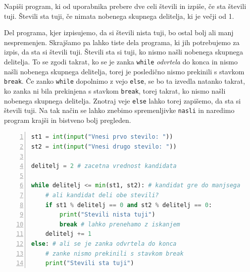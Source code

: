 \begin{zgled}
Napiši program, ki od uporabnika prebere dve celi števili in izpiše, če sta števili tuji. Števili sta tuji, če nimata nobenega skupnega delitelja, ki je večji od 1.
\end{zgled}
\begin{resitev}
Del programa, kjer izpisujemo, da si števili nista tuji, bo ostal bolj ali manj nespremenjen. Skrajšamo pa lahko tiste dela programa, ki jih potrebujemo za izpis, da sta si števili tuji. Števili sta si tuji, ko nismo našli nobenega skupnega delitelja. To se zgodi takrat, ko se je zanka \texttt{while} \emph{odvrtela} do konca in nismo našli nobenega skupnega delitelja, torej je posledično nismo prekinili s stavkom \texttt{break}. Če zanko \texttt{while} dopolnimo z vejo \texttt{else}, se bo ta izvedla natanko takrat, ko zanka ni bila prekinjena s stavkom \texttt{break}, torej takrat, ko nismo našli nobenega skupnega delitelja. Znotraj veje \texttt{else} lahko torej zapišemo, da sta si števili tuji. Na tak način se lahko znebimo spremenljivke \texttt{nasli} in naredimo program krajši in bistveno bolj pregleden.
\begin{lstlisting}[language=Python, showstringspaces=false,numbers=left]
st1 = int(input("Vnesi prvo stevilo: "))
st2 = int(input("Vnesi drugo stevilo: "))

delitelj = 2 # zacetna vrednost kandidata

while delitelj <= min(st1, st2): # kandidat gre do manjsega
    # ali kandidat deli obe stevili?
    if st1 % delitelj == 0 and st2 % delitelj == 0:
        print("Stevili nista tuji")
        break # lahko prenehamo z iskanjem
    delitelj += 1 
else: # ali se je zanka odvrtela do konca
    # zanke nismo prekinili s stavkom break
    print("Stevili sta tuji")
\end{lstlisting}
\end{resitev}